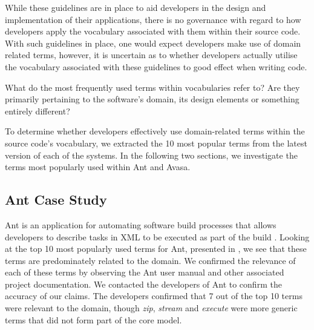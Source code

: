 While these guidelines are in place to aid developers in the design and implementation of their applications, there is no governance with regard to how developers apply the vocabulary associated with them within their source code. With such guidelines in place, one would expect developers make use of domain related terms, however, it is uncertain as to whether developers actually utilise the vocabulary associated with these guidelines to good effect when writing code.

What do the most frequently used terms within vocabularies refer to? Are they primarily pertaining to the software's domain, its design elements or something entirely different?

To determine whether developers effectively use domain-related terms within the source code's vocabulary, we extracted the 10 most popular terms from the latest version of each of the systems. In the following two sections, we investigate the terms most popularly used within Ant and Avasa.

\subsection{Ant Case Study} %
\label{sub:ant_case_study}

Ant is an application for automating software build processes that allows developers to describe tasks in XML to be executed as part of the build \cite{Ant10a}. Looking at the top 10 most popularly used terms for Ant, presented in , we see that these terms are predominately related to the domain. We confirmed the relevance of each of these terms by observing the Ant user manual and other associated project documentation. We contacted the developers of Ant to confirm the accuracy of our claims. The developers confirmed that 7 out of the top 10 terms were relevant to the domain, though \emph{zip}, \emph{stream} and \emph{execute} were more generic terms that did not form part of the core model.

